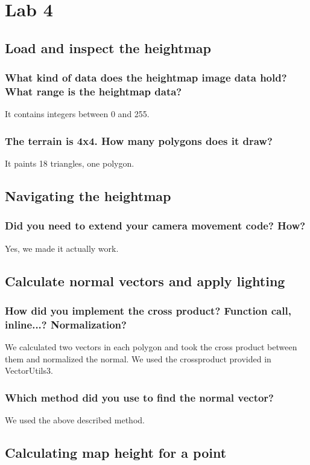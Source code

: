 \documentclass[a4paper,12pt]{article}
\begin{document}
\section{Lab 4}
\subsection{Load and inspect the heightmap}
\subsubsection{What kind of data does the heightmap image data hold? What range is the heightmap data?}
It contains integers between 0 and 255.

\subsubsection{The terrain is 4x4. How many polygons does it draw?}
It paints 18 triangles, one polygon.


\subsection{Navigating the heightmap}
\subsubsection{Did you need to extend your camera movement code? How?}
Yes, we made it actually work.

\subsection{Calculate normal vectors and apply lighting}
\subsubsection{How did you implement the cross product? Function call, inline...? Normalization? }
We calculated two vectors in each polygon and took the cross product between them and normalized the normal. We used the crossproduct provided in VectorUtils3.

\subsubsection{Which method did you use to find the normal vector?}
We used the above described method.

\subsection{Calculating map height for a point}
\end{document}
